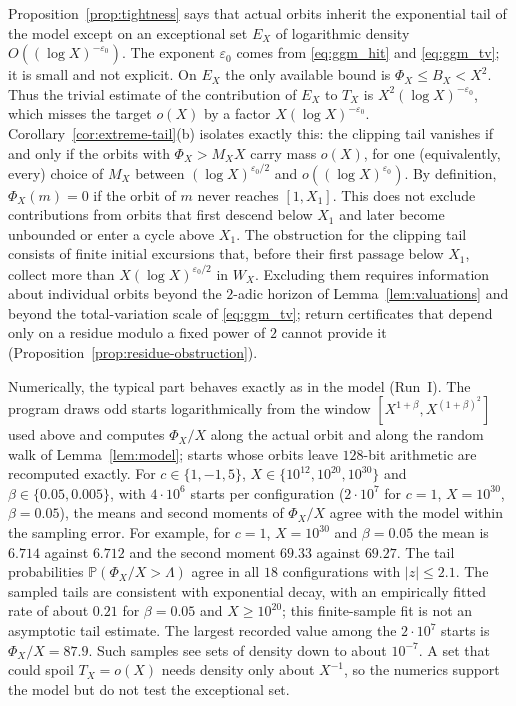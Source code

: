 \begin{remark}
\label{rem:tail-barrier}
Proposition~\ref{prop:tightness} says that actual orbits inherit the
exponential tail of the model except on an exceptional set $E_X$ of
logarithmic density $O((\log X)^{-\varepsilon_0})$. The exponent
$\varepsilon_0$ comes from \eqref{eq:ggm_hit} and \eqref{eq:ggm_tv}; it
is small and not explicit. On $E_X$ the only available bound is
$\Phi_X\le B_X<X^2$. Thus the trivial estimate of the contribution of
$E_X$ to $T_X$ is $X^2(\log X)^{-\varepsilon_0}$, which misses the
target $o(X)$ by a factor $X(\log X)^{-\varepsilon_0}$.
Corollary~\ref{cor:extreme-tail}(b) isolates exactly this: the clipping
tail vanishes if and only if the orbits with $\Phi_X>M_XX$ carry mass
$o(X)$, for one (equivalently, every) choice of $M_X$ between
$(\log X)^{\varepsilon_0/2}$ and $o((\log X)^{\varepsilon_0})$.
By definition, $\Phi_X(m)=0$ if the orbit of $m$ never reaches
$[1,X_1]$. This does not exclude contributions from orbits that
first descend below $X_1$ and later become unbounded or enter a
cycle above $X_1$. The obstruction for the clipping tail consists of
finite initial excursions that, before their first passage below $X_1$,
collect more than $X(\log X)^{\varepsilon_0/2}$ in $W_X$.
Excluding them requires information about individual orbits beyond the
$2$-adic horizon of Lemma~\ref{lem:valuations} and beyond the
total-variation scale of \eqref{eq:ggm_tv}; return certificates that
depend only on a residue modulo a fixed power of $2$ cannot provide it
(Proposition~\ref{prop:residue-obstruction}).

Numerically, the typical part behaves exactly as in the model (Run~I).
The program  draws odd starts logarithmically from the
window $[X^{1+\beta},X^{(1+\beta)^2}]$ used above and computes
$\Phi_X/X$ along the actual orbit and along the random walk of
Lemma~\ref{lem:model}; starts whose orbits leave $128$-bit arithmetic
are recomputed exactly. For $c\in\{1,-1,5\}$,
$X\in\{10^{12},10^{20},10^{30}\}$ and $\beta\in\{0.05,0.005\}$, with
$4\cdot10^6$ starts per configuration ($2\cdot10^7$ for $c=1$,
$X=10^{30}$, $\beta=0.05$), the means and second moments of $\Phi_X/X$
agree with the model within the sampling error. For example, for $c=1$,
$X=10^{30}$ and $\beta=0.05$ the mean is $6.714$ against $6.712$ and the
second moment $69.33$ against $69.27$. The tail probabilities
$\mathbb P(\Phi_X/X>\Lambda)$ agree in all $18$ configurations with
$|z|\le2.1$. The sampled tails are consistent with exponential decay, with an
empirically fitted rate of about $0.21$ for $\beta=0.05$ and
$X\ge10^{20}$; this finite-sample fit is not an asymptotic tail
estimate. The largest recorded value among the $2\cdot10^7$ starts
is $\Phi_X/X=87.9$. Such samples see sets of
density down to about $10^{-7}$. A set that could spoil $T_X=o(X)$ needs
density only about $X^{-1}$, so the numerics support the model but do
not test the exceptional set.
\end{remark}
